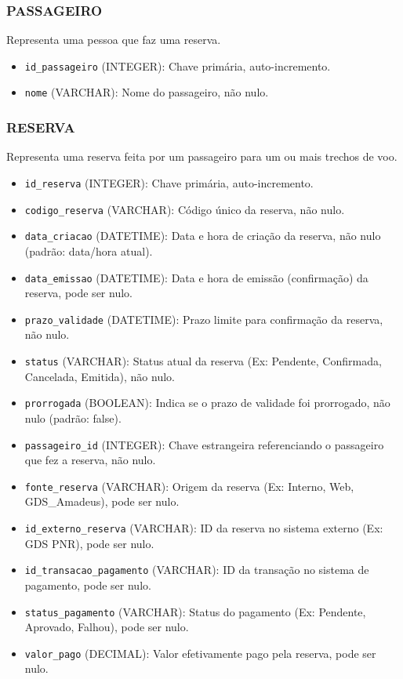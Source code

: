 \subsubsection*{PASSAGEIRO}
Representa uma pessoa que faz uma reserva.
\begin{itemize}
    \item \texttt{id\_passageiro} (INTEGER): Chave primária, auto-incremento.
    \item \texttt{nome} (VARCHAR): Nome do passageiro, não nulo.
\end{itemize}

\subsubsection*{RESERVA}
Representa uma reserva feita por um passageiro para um ou mais trechos de voo.
\begin{itemize}
    \item \texttt{id\_reserva} (INTEGER): Chave primária, auto-incremento.
    \item \texttt{codigo\_reserva} (VARCHAR): Código único da reserva, não nulo.
    \item \texttt{data\_criacao} (DATETIME): Data e hora de criação da reserva, não nulo (padrão: data/hora atual).
    \item \texttt{data\_emissao} (DATETIME): Data e hora de emissão (confirmação) da reserva, pode ser nulo.
    \item \texttt{prazo\_validade} (DATETIME): Prazo limite para confirmação da reserva, não nulo.
    \item \texttt{status} (VARCHAR): Status atual da reserva (Ex: Pendente, Confirmada, Cancelada, Emitida), não nulo.
    \item \texttt{prorrogada} (BOOLEAN): Indica se o prazo de validade foi prorrogado, não nulo (padrão: false).
    \item \texttt{passageiro\_id} (INTEGER): Chave estrangeira referenciando o passageiro que fez a reserva, não nulo.
    \item \texttt{fonte\_reserva} (VARCHAR): Origem da reserva (Ex: Interno, Web, GDS\_Amadeus), pode ser nulo.
    \item \texttt{id\_externo\_reserva} (VARCHAR): ID da reserva no sistema externo (Ex: GDS PNR), pode ser nulo.
    \item \texttt{id\_transacao\_pagamento} (VARCHAR): ID da transação no sistema de pagamento, pode ser nulo.
    \item \texttt{status\_pagamento} (VARCHAR): Status do pagamento (Ex: Pendente, Aprovado, Falhou), pode ser nulo.
    \item \texttt{valor\_pago} (DECIMAL): Valor efetivamente pago pela reserva, pode ser nulo.
\end{itemize}

